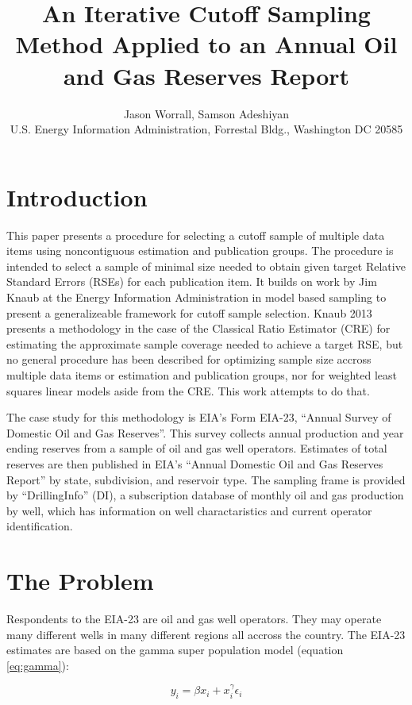 \documentclass[11pt]{article}\usepackage[]{graphicx}\usepackage[]{color}
\title{An Iterative Cutoff Sampling Method Applied to an Annual Oil and Gas Reserves Report}
\author{Jason Worrall, Samson Adeshiyan\\
U.S. Energy Information Administration, Forrestal Bldg., Washington DC 20585}
\begin{document}
\maketitle
\section{Introduction}
This paper presents a procedure for selecting a cutoff sample of multiple data items using noncontiguous estimation and publication groups. The procedure is intended to select a sample of minimal size needed to obtain given target Relative Standard Errors (RSEs) for each publication item. It builds on work by Jim Knaub at the Energy Information Administration in model based sampling to present a generalizeable framework for cutoff sample selection.  Knaub 2013 \cite{Knaub2013} 
presents a methodology in the case of the Classical Ratio Estimator (CRE) for estimating the approximate sample coverage needed to achieve a target RSE, but no general procedure has been described for optimizing sample size accross multiple data items or estimation and publication groups, nor for weighted least squares linear models aside from the CRE. This work attempts to do that.
\par
The case study for this methodology is EIA's Form EIA-23, ``Annual Survey of Domestic Oil and Gas Reserves''. This survey collects annual production and year ending reserves from a sample of oil and gas well operators.  Estimates of total reserves are then published in EIA's ``Annual Domestic Oil and Gas Reserves Report'' by state, subdivision, and reservoir type. The sampling frame is provided by ``DrillingInfo'' (DI), a subscription database of monthly oil and gas production by well, which has information on well charactaristics and current operator identification.

\section{The Problem}
Respondents to the EIA-23 are oil and gas well operators. They may operate many different wells in many different regions all accross the country. The EIA-23 estimates are based on the gamma super population model (equation \ref{eq:gamma}):

\begin{equation} \label{eq:gamma}
y_i=\beta x_i + x_i^{\gamma}\epsilon_i
\end{equation}
\end{document}
